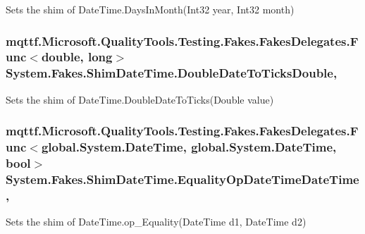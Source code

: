 Sets the shim of Date\-Time.\-Days\-In\-Month(\-Int32 year, Int32 month)

\hypertarget{class_system_1_1_fakes_1_1_shim_date_time_af33423d592496b8150e8672cfb346e50}{
\subsubsection[{Double\-Date\-To\-Ticks\-Double}]{\setlength{\rightskip}{0pt plus 5cm}mqttf.\-Microsoft.\-Quality\-Tools.\-Testing.\-Fakes.\-Fakes\-Delegates.\-Func$<$double, long$>$ System.\-Fakes.\-Shim\-Date\-Time.\-Double\-Date\-To\-Ticks\-Double\hspace{0.3cm}{\ttfamily [static]}, {\ttfamily [set]}}}\label{class_system_1_1_fakes_1_1_shim_date_time_af33423d592496b8150e8672cfb346e50}


Sets the shim of Date\-Time.\-Double\-Date\-To\-Ticks(\-Double value)

\hypertarget{class_system_1_1_fakes_1_1_shim_date_time_a245d7c148aea56bd3b3be2a8a5b58fcc}{
\subsubsection[{Equality\-Op\-Date\-Time\-Date\-Time}]{\setlength{\rightskip}{0pt plus 5cm}mqttf.\-Microsoft.\-Quality\-Tools.\-Testing.\-Fakes.\-Fakes\-Delegates.\-Func$<$global.\-System.\-Date\-Time, global.\-System.\-Date\-Time, bool$>$ System.\-Fakes.\-Shim\-Date\-Time.\-Equality\-Op\-Date\-Time\-Date\-Time\hspace{0.3cm}{\ttfamily [static]}, {\ttfamily [set]}}}\label{class_system_1_1_fakes_1_1_shim_date_time_a245d7c148aea56bd3b3be2a8a5b58fcc}


Sets the shim of Date\-Time.\-op\-\_\-\-Equality(\-Date\-Time d1, Date\-Time d2)

